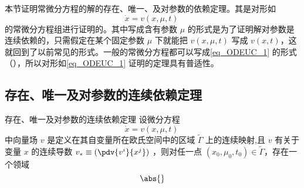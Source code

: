 
本节证明常微分方程的解的存在、唯一、及对参数的依赖定理。其是对形如
\begin{equation}\label{eq_ODEUC_1}
\dot x=v(x,\mu,t)~
\end{equation}
的常微分方程组进行证明的。其中写成含有参数 $\mu$ 的形式是为了证明解对参数是连续依赖的，只需假定在某个固定参数 $\mu$ 下就能把 $v(x,\mu,t)$ 写成 $v(x,t)$，这就回到了以前常见的形式。一般的常微分方程都可以写成\autoref{eq_ODEUC_1} 的形式（），所以对形如\autoref{eq_ODEUC_1} 证明的定理具有普适性。
\subsection{存在、唯一及对参数的连续依赖定理}
\begin{theorem}{存在、唯一及对参数的连续依赖定理}
设微分方程
\begin{equation}
\dot x=v(x,\mu,t)~
\end{equation}
中向量场 $v$ 是定义在其自变量所在欧氏空间中的区域 $\tilde\Gamma$ 上的连续映射,且 $v$ 有关于变量 $x$ 的连续导数 $v_*\equiv(\pdv{v^i}{x^j})$ ，则对任一点 $(x_0,\mu_0,t_0)\in\tilde\Gamma$，存在一个领域
\begin{equation}
\abs{}
\end{equation}

\end{theorem}
